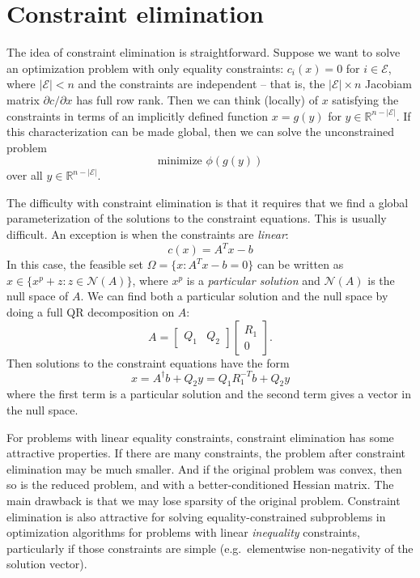 \documentclass[12pt, leqno]{article} %
\begin{document}
\section{Constraint elimination}

The idea of constraint elimination is straightforward. Suppose we want
to solve an optimization problem with only equality constraints:
\(c_i(x) = 0\) for \(i \in \mathcal{E}\), where \(|\mathcal{E}| < n\)
and the constraints are independent -- that is, the
\(|\mathcal{E}| \times n\) Jacobiam matrix \(\partial c / \partial x\)
has full row rank. Then we can think (locally) of \(x\) satisfying the
constraints in terms of an implicitly defined function \(x = g(y)\) for
\(y \in {\mathbb{R}}^{n-|\mathcal{E}|}\). If this characterization can
be made global, then we can solve the unconstrained problem
\[\mbox{minimize } \phi(g(y))\] over all
\(y \in {\mathbb{R}}^{n-|\mathcal{E}|}\).

The difficulty with constraint elimination is that it requires that we
find a global parameterization of the solutions to the constraint
equations. This is usually difficult. An exception is when the
constraints are \emph{linear}: \[c(x) = A^T x - b\] In this case, the
feasible set \(\Omega = \{ x : A^T x - b = 0 \}\) can be written as
\(x \in \{ x^p + z : z \in \mathcal{N}(A) \}\), where \(x^p\) is a
\emph{particular solution} and \(\mathcal{N}(A)\) is the null space of
\(A\). We can find both a particular solution and the null space by
doing a full QR decomposition on \(A\):
\[A = \begin{bmatrix} Q_1 & Q_2 \end{bmatrix}
      \begin{bmatrix} R_1 \\ 0 \end{bmatrix}.\] Then solutions to the
constraint equations have the form
\[x = A^\dagger b + Q_2 y = Q_1 R_1^{-T} b + Q_2 y\] where the first
term is a particular solution and the second term gives a vector in the
null space.

For problems with linear equality constraints, constraint elimination
has some attractive properties. If there are many constraints, the
problem after constraint elimination may be much smaller. And if the
original problem was convex, then so is the reduced problem, and with a
better-conditioned Hessian matrix. The main drawback is that we may lose
sparsity of the original problem. Constraint elimination is also
attractive for solving equality-constrained subproblems in optimization
algorithms for problems with linear \emph{inequality} constraints,
particularly if those constraints are simple (e.g.~elementwise
non-negativity of the solution vector).
\end{document}

